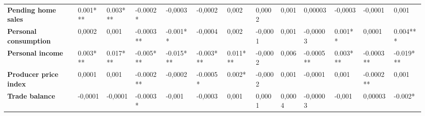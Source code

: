 \begin{landscape}
\begin{table}[]
{\begin{tabular}{@{}lllllllllllll@{}}
\textbf{Pending home sales}       & 0.001***                                & 0.003***                                & -0.0002*                                & -0,0003                                 & -0,0002                                 & 0,002                                   & 0,0002                                  & 0,001                                   & 0,00003                                 & -0,0003                                 & -0,0001                                 & 0,001                                   \\
\textbf{Personal consumption}     & 0,0002                                  & 0,001                                   & -0.0003**                               & -0.001**                                & -0,0004                                 & 0,002                                   & -0,0001                                 & 0,001                                   & -0,00003                                & 0.001**                                 & 0,0001                                  & 0.004***                                \\
\textbf{Personal income}          & 0.003***                                & 0.017***                                & -0.005***                               & -0.015***                               & -0.003***                               & 0.011***                                & -0,0002                                 & 0,006                                   & -0.0005**                               & 0.003***                                & -0.0003**                               & -0.019***                               \\
\textbf{Producer price index}     & 0,0001                                  & 0,001                                   & -0.0002**                               & -0,0002                                 & -0.0005*                                & 0.002*                                  & -0,0002                                 & 0,001                                   & -0,0001                                 & 0,001                                   & -0.0002**                               & 0,001                                   \\
\textbf{Trade balance}            & -0,0001                                 & -0,0001                                 & -0.0003*                                & -0,001                                  & -0,0003                                 & 0,001                                   & 0,0001                                  & 0,0004                                  & -0,00003                                & -0,001                                  & 0,00003                                 & -0.002*                                 \\ \bottomrule
\end{tabular}%
}


\end{table}
\end{landscape}
